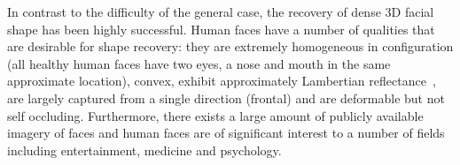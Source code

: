 In contrast to the difficulty of the general case, the recovery of dense 3D
facial shape has been highly successful. Human faces have a number of qualities
that are desirable for shape recovery: they are extremely homogeneous in
configuration (all healthy human faces have two eyes, a nose and mouth in the
same approximate location), convex, exhibit approximately Lambertian 
reflectance~\cite{Sirovich:1987te,georghiades2001fromfew,Basri:2003ie,turk1991eigenfaces,Hallinan:1994dz,ramamoorthi2002analytic,ramamoorthi2001relationship,shashua1997photometric,moses1993face},
are largely captured from a single direction (frontal) and are deformable
but not self occluding. Furthermore, there exists a large amount of publicly
available imagery of faces and human faces are of significant interest to a 
number of fields including entertainment, medicine and psychology.
